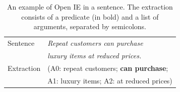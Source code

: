 \documentclass[letterpaper]{article} %
\begin{document}
\begin{table}[t!]
\begin{center}
\begin{tabular}{|l|l|}
\hline
Sentence & \emph{Repeat customers can purchase} \\
& \emph{luxury items at reduced prices.}\\
\hline
Extraction & (A0: repeat customers; \textbf{can purchase}; \\
&A1: luxury items; A2: at reduced prices)\\
\hline
\end{tabular}
\end{center}
\caption{An example of Open IE in a sentence. The extraction consists of a predicate (in bold) and a list of arguments, separated by semicolons.}
\label{simple_example}
\end{table}
\end{document}
